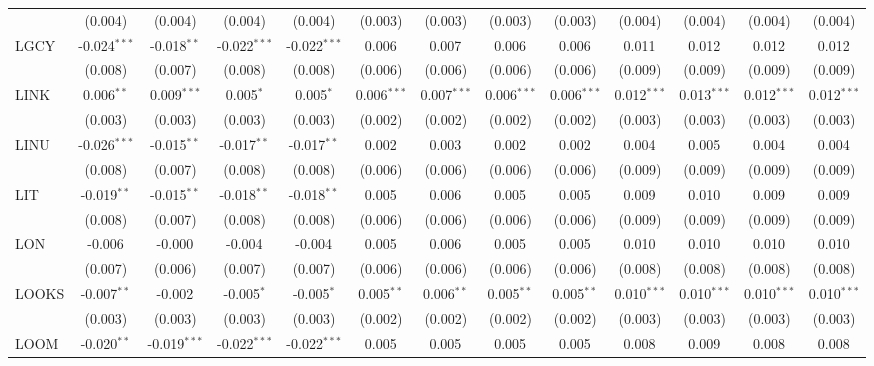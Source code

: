 \begin{table}[!htbp]
\begin{tabular}{@{\extracolsep{5pt}}lcccccccccccc}
  & (0.004) & (0.004) & (0.004) & (0.004) & (0.003) & (0.003) & (0.003) & (0.003) & (0.004) & (0.004) & (0.004) & (0.004) \\
 LGCY & -0.024$^{***}$ & -0.018$^{**}$ & -0.022$^{***}$ & -0.022$^{***}$ & 0.006$^{}$ & 0.007$^{}$ & 0.006$^{}$ & 0.006$^{}$ & 0.011$^{}$ & 0.012$^{}$ & 0.012$^{}$ & 0.012$^{}$ \\
  & (0.008) & (0.007) & (0.008) & (0.008) & (0.006) & (0.006) & (0.006) & (0.006) & (0.009) & (0.009) & (0.009) & (0.009) \\
 LINK & 0.006$^{**}$ & 0.009$^{***}$ & 0.005$^{*}$ & 0.005$^{*}$ & 0.006$^{***}$ & 0.007$^{***}$ & 0.006$^{***}$ & 0.006$^{***}$ & 0.012$^{***}$ & 0.013$^{***}$ & 0.012$^{***}$ & 0.012$^{***}$ \\
  & (0.003) & (0.003) & (0.003) & (0.003) & (0.002) & (0.002) & (0.002) & (0.002) & (0.003) & (0.003) & (0.003) & (0.003) \\
 LINU & -0.026$^{***}$ & -0.015$^{**}$ & -0.017$^{**}$ & -0.017$^{**}$ & 0.002$^{}$ & 0.003$^{}$ & 0.002$^{}$ & 0.002$^{}$ & 0.004$^{}$ & 0.005$^{}$ & 0.004$^{}$ & 0.004$^{}$ \\
  & (0.008) & (0.007) & (0.008) & (0.008) & (0.006) & (0.006) & (0.006) & (0.006) & (0.009) & (0.009) & (0.009) & (0.009) \\
 LIT & -0.019$^{**}$ & -0.015$^{**}$ & -0.018$^{**}$ & -0.018$^{**}$ & 0.005$^{}$ & 0.006$^{}$ & 0.005$^{}$ & 0.005$^{}$ & 0.009$^{}$ & 0.010$^{}$ & 0.009$^{}$ & 0.009$^{}$ \\
  & (0.008) & (0.007) & (0.008) & (0.008) & (0.006) & (0.006) & (0.006) & (0.006) & (0.009) & (0.009) & (0.009) & (0.009) \\
 LON & -0.006$^{}$ & -0.000$^{}$ & -0.004$^{}$ & -0.004$^{}$ & 0.005$^{}$ & 0.006$^{}$ & 0.005$^{}$ & 0.005$^{}$ & 0.010$^{}$ & 0.010$^{}$ & 0.010$^{}$ & 0.010$^{}$ \\
  & (0.007) & (0.006) & (0.007) & (0.007) & (0.006) & (0.006) & (0.006) & (0.006) & (0.008) & (0.008) & (0.008) & (0.008) \\
 LOOKS & -0.007$^{**}$ & -0.002$^{}$ & -0.005$^{*}$ & -0.005$^{*}$ & 0.005$^{**}$ & 0.006$^{**}$ & 0.005$^{**}$ & 0.005$^{**}$ & 0.010$^{***}$ & 0.010$^{***}$ & 0.010$^{***}$ & 0.010$^{***}$ \\
  & (0.003) & (0.003) & (0.003) & (0.003) & (0.002) & (0.002) & (0.002) & (0.002) & (0.003) & (0.003) & (0.003) & (0.003) \\
 LOOM & -0.020$^{**}$ & -0.019$^{***}$ & -0.022$^{***}$ & -0.022$^{***}$ & 0.005$^{}$ & 0.005$^{}$ & 0.005$^{}$ & 0.005$^{}$ & 0.008$^{}$ & 0.009$^{}$ & 0.008$^{}$ & 0.008$^{}$ \\

\end{tabular}
\end{table}
